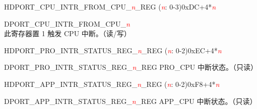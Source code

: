 \begin{register}{H}{DPORT\_CPU\_INTR\_FROM\_CPU\_\textcolor{red}{\it{n}}\_REG (\textcolor{red}{\it{n}}: 0-3)}{0xDC+4*\textcolor{red}{\it{n}}}\label{regdesc:CPUINTRFROMCPUnREG}
%
%
\regnewline%
\begin{regdesc}\begin{reglist}
\item [DPORT\_CPU\_INTR\_FROM\_CPU\_\textcolor{red}{\it{n}}]此寄存器置 1 触发 CPU 中断。（读/写）
\end{reglist}\end{regdesc}
\end{register}


\begin{register}{H}{DPORT\_PRO\_INTR\_STATUS\_REG\_\textcolor{red}{\it{n}}\_REG (\textcolor{red}{\it{n}}: 0-2)}{0xEC+4*\textcolor{red}{\it{n}}}\label{regdesc:PROINTRSTATUSREGnREG}
%
\regnewline%
\begin{regdesc}\begin{reglist}
\item [DPORT\_PRO\_INTR\_STATUS\_REG\_\textcolor{red}{\textcolor{red}{\it{n}}}\_REG]PRO\_CPU 中断状态。（只读）
\end{reglist}\end{regdesc}
\end{register}


\begin{register}{H}{DPORT\_APP\_INTR\_STATUS\_REG\_\textcolor{red}{\it{n}}\_REG (\textcolor{red}{\it{n}}: 0-2)}{0xF8+4*\textcolor{red}{\it{n}}}\label{regdesc:APPINTRSTATUSREGnREG}
%
\regnewline%
\begin{regdesc}\begin{reglist}
\item [DPORT\_APP\_INTR\_STATUS\_REG\_\textcolor{red}{\textcolor{red}{\it{n}}}\_REG]APP\_CPU 中断状态。（只读）
\end{reglist}\end{regdesc}
\end{register}



